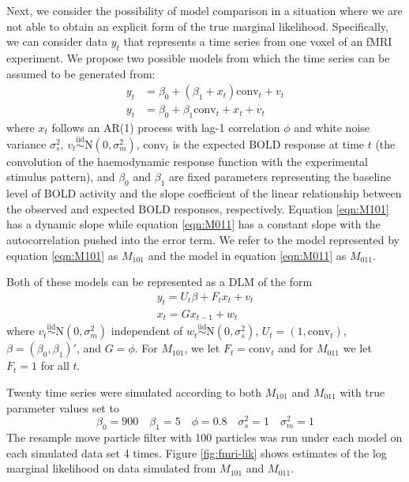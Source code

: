 \documentclass{article}
\begin{document}
Next, we consider the possibility of model comparison in a situation where we are not able to obtain an explicit form of the true marginal likelihood. Specifically, we can consider data $y_t$ that represents a time series from one voxel of an fMRI experiment. We propose two possible models from which the time series can be assumed to be generated from:
\begin{align}
y_t &= \beta_0 + (\beta_1 + x_t)\mbox{conv}_t + v_t \label{eqn:M101} \\
y_t &= \beta_0 + \beta_1\mbox{conv}_t + x_t + v_t \label{eqn:M011}
\end{align}
\noindent where $x_t$ follows an AR(1) process with lag-1 correlation $\phi$ and white noise variance $\sigma^2_s$, $v_t \stackrel{\mbox{iid}}{\sim} \mbox{N}(0,\sigma^2_m)$, $\mbox{conv}_t$ is the expected BOLD response at time $t$ (the convolution of the haemodynamic response function with the experimental stimulus pattern), and $\beta_0$ and $\beta_1$ are fixed parameters representing the baseline level of BOLD activity and the slope coefficient of the linear relationship between the observed and expected BOLD responses, respectively. Equation \eqref{eqn:M101} has a dynamic slope while equation \eqref{eqn:M011} has a constant slope with the autocorrelation pushed into the error term. We refer to the model represented by equation \eqref{eqn:M101} as $M_{101}$ and the model in equation \eqref{eqn:M011} as $M_{011}$.

Both of these models can be represented as a DLM of the form
\begin{align}
y_t = U_t\beta + F_tx_t + v_t \label{eqn:obs} \\
x_t = Gx_{t-1} + w_t \label{eqn:state}
\end{align}
\noindent where $v_t \stackrel{\mbox{iid}}{\sim} \mbox{N}(0,\sigma^2_m)$ independent of $w_t \stackrel{\mbox{iid}}{\sim} \mbox{N}(0,\sigma^2_s)$, $U_t = (1, \mbox{conv}_t)$, $\beta = (\beta_0,\beta_1)'$, and $G = \phi$. For $M_{101}$, we let $F_t = \mbox{conv}_t$ and for $M_{011}$ we let $F_t = 1$ for all $t$.

Twenty time series were simulated according to both $M_{101}$ and $M_{011}$ with true parameter values set to \[\beta_0 = 900 \quad \beta_1 = 5 \quad \phi = 0.8 \quad \sigma^2_s = 1 \quad \sigma^2_m = 1\] The resample move particle filter with 100 particles was run under each model on each simulated data set 4 times. Figure \ref{fig:fmri-lik} shows estimates of the log marginal likelihood on data simulated from $M_{101}$ and $M_{011}$.
\end{document}
